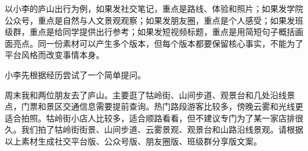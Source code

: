 以小李的庐山出行为例，如果发社交笔记，重点是路线、体验和照片；如果发学院公众号，重点是自然与人文景观观察；如果发朋友圈，重点是个人感受；如果发班级群，重点是给同学提供出行参考；如果发短视频标题，重点是用简短句子概括画面亮点。同一份素材可以产生多个版本，但每个版本都要保留核心事实，不能为了平台风格而改变事情本身。

小李先根据经历尝试了一个简单提问。

\begin{userbox}
周末我和两位朋友去了庐山。主要逛了牯岭街、山间步道、观景台和几处沿线景点，门票和景区交通信息需要提前查询。热门路段游客比较多，傍晚云雾和光线更适合拍照。牯岭街小店人比较多，适合顺路看看，但不建议专门为了某一家店排很久。我们拍了牯岭街街景、山间步道、云雾景观、观景台和山路沿线景观。请根据以上素材生成社交平台版、公众号版、朋友圈版、班级群分享版文案。
\end{userbox}

